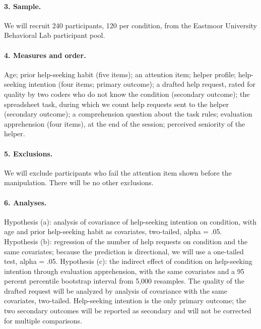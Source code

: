\documentclass[11pt]{article}
\begin{document}
\paragraph{3. Sample.} We will recruit 240 participants, 120 per condition, from the Eastmoor University Behavioral Lab participant pool.

\paragraph{4. Measures and order.} Age; prior help-seeking habit (five items); an attention item; helper profile; help-seeking intention (four items; primary outcome); a drafted help request, rated for quality by two coders who do not know the condition (secondary outcome); the spreadsheet task, during which we count help requests sent to the helper (secondary outcome); a comprehension question about the task rules; evaluation apprehension (four items), at the end of the session; perceived seniority of the helper.

\paragraph{5. Exclusions.} We will exclude participants who fail the attention item shown before the manipulation. There will be no other exclusions.

\paragraph{6. Analyses.} Hypothesis (a): analysis of covariance of help-seeking intention on condition, with age and prior help-seeking habit as covariates, two-tailed, alpha = .05. Hypothesis (b): regression of the number of help requests on condition and the same covariates; because the prediction is directional, we will use a one-tailed test, alpha = .05. Hypothesis (c): the indirect effect of condition on help-seeking intention through evaluation apprehension, with the same covariates and a 95 percent percentile bootstrap interval from 5,000 resamples. The quality of the drafted request will be analyzed by analysis of covariance with the same covariates, two-tailed. Help-seeking intention is the only primary outcome; the two secondary outcomes will be reported as secondary and will not be corrected for multiple comparisons.
\end{document}
